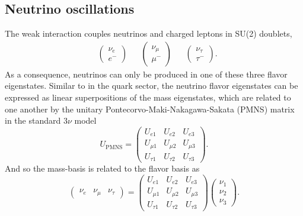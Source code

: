 \documentclass[main.tex]{subfiles}
\begin{document}
\subsection{Neutrino oscillations}

The weak interaction couples neutrinos and charged leptons in SU(2) doublets,
\begin{align}
&\left(\begin{array}{c} \nu_{e} \\ e^{-} \end{array}\right) & &\left(\begin{array}{c} \nu_{\mu} \\ \mu^{-} \end{array}\right) & &\left(\begin{array}{c} \nu_{\tau} \\ \tau^{-} \end{array}\right).
\end{align}
As a consequence, neutrinos can only be produced in one of these three flavor eigenstates.
Similar to in the quark sector, the neutrino flavor eigenstates can be expressed as linear superpositions of the mass eigenstates, which are related to one another by the unitary Pontecorvo-Maki-Nakagawa-Sakata (PMNS) matrix in the standard $3\nu$ model
\begin{equation}
    U_{\text{PMNS}} = \left(\begin{array}{ccc} U_{e1} & U_{e2} & U_{e3} \\ U_{\mu 1} & U_{\mu 2} & U_{\mu 3} \\ U_{\tau 1} & U_{\tau 2} & U_{\tau 3} \end{array}\right).
\end{equation}
And so the mass-basis is related to the flavor basis as
\begin{equation}
    \left(\begin{array}{ccc} \nu_{e} & \nu_{\mu} & \nu_{\tau} \end{array}\right)  = \left(\begin{array}{ccc} U_{e1} & U_{e2} & U_{e3} \\ U_{\mu 1} & U_{\mu 2} & U_{\mu 3} \\ U_{\tau 1} & U_{\tau 2} & U_{\tau 3} \end{array}\right) \left(\begin{array}{c} \nu_{1} \\ \nu_{2} \\ \nu_{3} \end{array}\right).
\end{equation}
\end{document}
